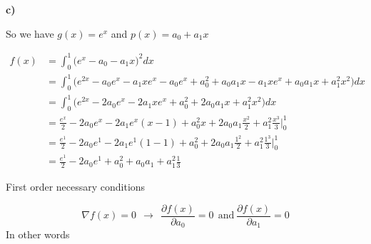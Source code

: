 \textbf{c)}

\answer

So we have $g(x) = e^x$ and $p(x) = a_0 + a_1 x$

\begin{align*}
    f(x) &= \int_{0}^{1} \Big( e^x - a_0 - a_1 x\Big)^2 dx \\
    &= \int_{0}^{1} \Big( 
        e^{2x} - a_0e^x - a_1 x e^x
        -a_0 e^x + a_0^2 + a_0 a_1 x
        -a_1xe^x + a_0 a_1 x + a_1^2x^2    
    \Big) dx \\
    &= \int_{0}^{1} \Big( 
        e^{2x} - 2a_0e^x - 2a_1 x e^x
         + a_0^2 + 2a_0 a_1 x
          + a_1^2x^2    
    \Big) dx \\
    &= \frac{e^{x}}{2} - 2a_0e^x - 2a_1 e^x(x-1) + a_0^2 x + 2a_0 a_1 \frac{x^2}{2} + a_1^2 \frac{x^3}{3}\Bigg|_0^1 \\
    &= \frac{e^{1}}{2} - 2a_0e^1 - 2a_1 e^1(1-1) + a_0^2 + 2a_0 a_1 \frac{1^2}{2} + a_1^2 \frac{1^3}{3}\Bigg|_0^1 \\
    &= \frac{e^{1}}{2} - 2a_0e^1 + a_0^2 + a_0 a_1 + a_1^2 \frac{1}{3}
\end{align*}

First order necessary conditions

\[
    \nabla f(x) = 0\ \ \rightarrow\ \ \frac{\partial f(x)}{\partial a_0} = 0\ \ \text{and}\ \frac{\partial f(x)}{\partial a_1} = 0
\]
In other words

